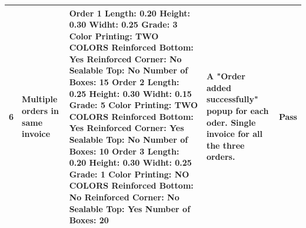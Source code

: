 \documentclass[12pt]{article}
\begin{document}
\newpage
\begin{tabular}{| p{1cm} | p{4cm} | p{4cm} | p{4cm} | p{2cm} |}
	\hline
	6 & Multiple orders in same invoice & \textbf{Order 1} \newline
	Length: 0.20 \newline
	Height: 0.30 \newline
	Widht: 0.25 \newline
	Grade: 3 \newline
	Color Printing: TWO COLORS \newline
	Reinforced Bottom: Yes \newline
	Reinforced Corner: No \newline
	Sealable Top: No \newline
	Number of Boxes: 15 \newline
	\newline
	\textbf{Order 2} \newline
	Length: 0.25 \newline
	Height: 0.30 \newline
	Widht: 0.15 \newline
	Grade: 5 \newline
	Color Printing: TWO COLORS \newline
	Reinforced Bottom: Yes \newline
	Reinforced Corner: Yes \newline
	Sealable Top: No \newline
	Number of Boxes: 10 \newline
	\newline
	\textbf{Order 3} \newline
	Length: 0.20 \newline
	Height: 0.30 \newline
	Widht: 0.25 \newline
	Grade: 1 \newline
	Color Printing: NO COLORS \newline
	Reinforced Bottom: No \newline
	Reinforced Corner: No \newline
	Sealable Top: Yes \newline
	Number of Boxes: 20 & A "Order added successfully" popup for each oder.\newline
	Single invoice for all the three orders. & Pass \\ \hline
\end{tabular}
\end{document}
